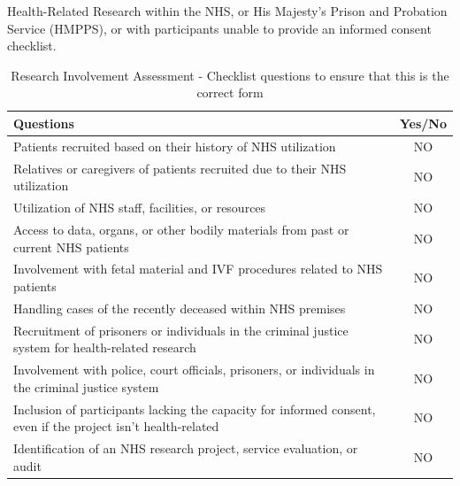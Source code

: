 \documentclass{article}
\begin{document}
Health-Related Research within the NHS, or His Majesty’s Prison and Probation Service (HMPPS), or with participants unable to provide an informed consent checklist.
\begin{table}[ht!]
\centering
\begin{tabular}{|p{10cm}|c|}
\hline
Questions & Yes/No \\
\hline
Patients recruited based on their history of NHS utilization & NO \\
Relatives or caregivers of patients recruited due to their NHS utilization & NO \\
Utilization of NHS staff, facilities, or resources & NO \\
Access to data, organs, or other bodily materials from past or current NHS patients & NO \\
Involvement with fetal material and IVF procedures related to NHS patients & NO \\
Handling cases of the recently deceased within NHS premises & NO \\
Recruitment of prisoners or individuals in the criminal justice system for health-related research & NO \\
Involvement with police, court officials, prisoners, or individuals in the criminal justice system & NO \\
Inclusion of participants lacking the capacity for informed consent, even if the project isn't health-related & NO \\
Identification of an NHS research project, service evaluation, or audit & NO \\
\hline
\end{tabular}
\caption{Research Involvement Assessment - Checklist questions to ensure that this is the correct form}
\end{table}

\newpage
\end{document}
